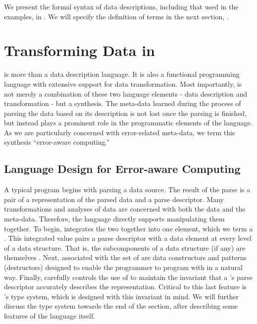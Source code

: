 \documentclass{entcs}
\begin{document}
We present the formal syntax of data descriptions, including that used
in the examples, in . We will specify the
definition of terms  in the next section, .

\section{Transforming Data in \datatype{}}
\label{sec:data-transformation}

\datatype{} is more than a data description language. It is also a
functional programming language with extensive support for data
transformation. Most importantly, \datatype{} is not merely a
combination of these two language elements - data description and
transformation - but a synthesis.  The meta-data learned during the
process of parsing the data based on its description is not lost once
the parsing is finished, but instead plays a prominent role in the
programmatic elements of the language. As we are particularly
concerned with error-related meta-data, we term this synthesis
``error-aware computing.''

\subsection{Language Design for Error-aware Computing}

A typical \datatype{} program begins with parsing a data source. The
result of the parse is a pair of a representation of the parsed data
and a parse descriptor. Many transformations and analyses of data are
concerned with both the data and the meta-data. Therefore, the
language directly supports manipulating them together. To begin,
\datatype{} integrates the two together into one element, which we
term a \pvalue{}. This integrated value pairs a parse descriptor with
a data element at every level of a data structure. That is, the
subcomponents of a data structure (if any) are themselves \pvalue{}.
Next, associated with the set of \pvalue{} are data constructors and
patterns (destructors) designed to enable the programmer to program
with \pvalue{} in a natural way.  Finally, \datatype{} carefully
controls the use of \pvalue{} to maintain the invariant that a
\pvalue{}'s parse descriptor accurately describes the representation.
Critical to this last feature is \datatype{}'s type system, which is
designed with this invariant in mind. We will further discuss the type
system towards the end of the section, after describing some features
of the language itself.
\end{document}
